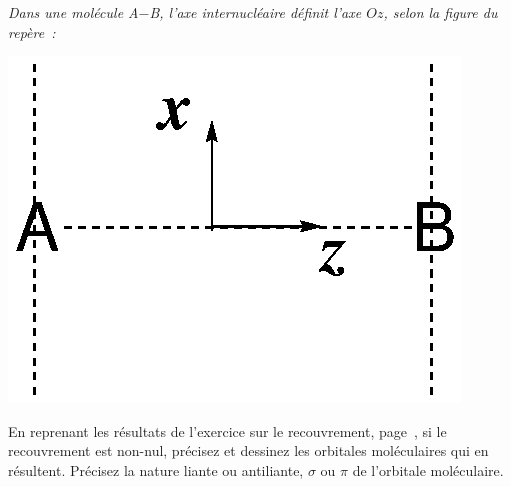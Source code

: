 
\parbox{0.5\textwidth}{\textit{Dans une mol\'ecule A$-$B, l'axe internucl\'eaire 
d\'efinit l'axe $Oz$, selon la figure du rep\`ere~:}}
\parbox{0.5\textwidth}{\centerline{\includegraphics[scale=0.4]{figure/AB_repere.eps}}}

En reprenant les r\'esultats de l'exercice sur le recouvrement, page~\pageref{exo_s}, 
si le recouvrement est non-nul, pr\'ecisez et dessinez les
orbitales mol\'eculaires qui en r\'esultent. Pr\'ecisez la nature
liante ou antiliante, $\sigma$ ou $\pi$ de l'orbitale mol\'eculaire.

\vspace{0.3cm}

